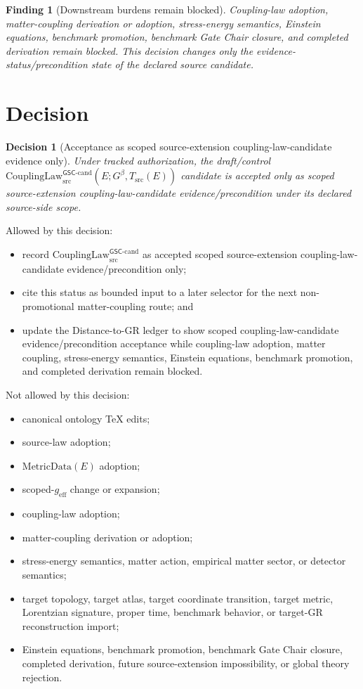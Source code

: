 \documentclass[11pt]{article}
\newcommand{\Gbeta}{G^\beta}
\newcommand{\geff}{g_{\mathrm{eff}}}
\newcommand{\CouplingLaw}{\mathrm{CouplingLaw}^{\mathsf{GSC}\mbox{-}\mathrm{cand}}_{\mathrm{src}}}
\newcommand{\MetricData}{\mathrm{MetricData}}
\newtheorem{decision}{Decision}
\newtheorem{finding}{Finding}
\begin{document}
\begin{finding}[Downstream burdens remain blocked]
Coupling-law adoption, matter-coupling derivation or adoption, stress-energy
semantics, Einstein equations, benchmark promotion, benchmark Gate Chair
closure, and completed derivation remain blocked. This decision changes only
the evidence-status/precondition state of the declared source candidate.
\end{finding}

\section{Decision}

\begin{decision}[Acceptance as scoped source-extension coupling-law-candidate evidence only]
Under tracked authorization, the draft/control
\(\CouplingLaw(E;\Gbeta,T_{\mathrm{src}}(E))\) candidate is accepted only as
scoped source-extension coupling-law-candidate evidence/precondition under
its declared source-side scope.
\end{decision}

Allowed by this decision:
\begin{itemize}[leftmargin=*]
  \item record \(\CouplingLaw\) as accepted scoped source-extension
  coupling-law-candidate evidence/precondition only;
  \item cite this status as bounded input to a later selector for the next
  non-promotional matter-coupling route; and
  \item update the Distance-to-GR ledger to show scoped coupling-law-candidate
  evidence/precondition acceptance while coupling-law adoption, matter
  coupling, stress-energy semantics, Einstein equations, benchmark promotion,
  and completed derivation remain blocked.
\end{itemize}

Not allowed by this decision:
\begin{itemize}[leftmargin=*]
  \item canonical ontology TeX edits;
  \item source-law adoption;
  \item \(\MetricData(E)\) adoption;
  \item scoped-\(\geff\) change or expansion;
  \item coupling-law adoption;
  \item matter-coupling derivation or adoption;
  \item stress-energy semantics, matter action, empirical matter sector, or
  detector semantics;
  \item target topology, target atlas, target coordinate transition, target
  metric, Lorentzian signature, proper time, benchmark behavior, or target-GR
  reconstruction import;
  \item Einstein equations, benchmark promotion, benchmark Gate Chair closure,
  completed derivation, future source-extension impossibility, or global
  theory rejection.
\end{itemize}
\end{document}
